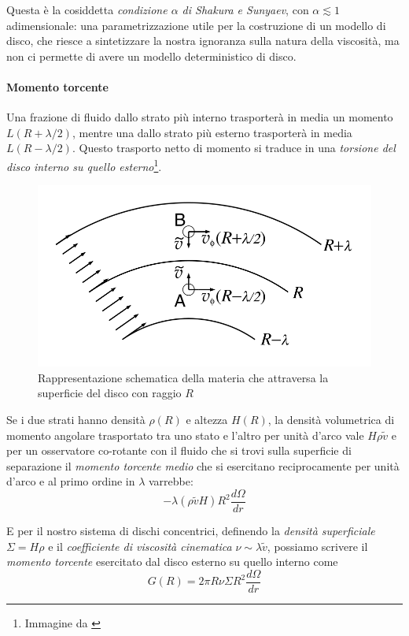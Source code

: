 \documentclass[a4paperbi]{article}
\begin{document}
	Questa è la cosiddetta \textit{condizione $\alpha$ di Shakura e Sunyaev}, con $\alpha\lesssim 1$ adimensionale: una parametrizzazione utile per la costruzione di un modello di disco, che riesce a sintetizzare la nostra ignoranza sulla natura della viscosità, ma non ci permette di avere un modello deterministico di disco.
	
	\paragraph{Momento torcente}	

	Una frazione di fluido dallo strato più interno trasporterà in media un momento $L(R+\lambda/2)$, mentre una dallo strato più esterno trasporterà in media $L(R-\lambda/2)$. Questo trasporto netto di momento si traduce in una \textit{torsione del disco interno su quello esterno}\footnote{Immagine da \cite{FrankKingRaineAccretionPower}}.
	
	\begin{figure}[H]
		\centering
		\includegraphics[width=0.6\linewidth]{TraspoMateria}
		\caption{Rappresentazione schematica della materia che attraversa la superficie del disco con raggio $R$}
		\label{fig:TraspoMateria}
	\end{figure}
		
	Se i due strati hanno densità $\rho(R)$ e altezza $H(R)$, la densità volumetrica di momento angolare trasportato tra uno stato e l'altro per unità d'arco vale $H\rho\tilde{v}$ e per un osservatore co-rotante con il fluido che si trovi sulla superficie di separazione il \textit{momento torcente medio} che si esercitano reciprocamente per unità d'arco e al primo ordine in $\lambda$ varrebbe:
	\begin{equation*}
		-\lambda(\rho\tilde{v} H) R^2\frac{d\Omega}{dr}
	\end{equation*}

	E per il nostro sistema di dischi concentrici, definendo la \textit{densità superficiale} $\Sigma=H\rho$ e il \textit{coefficiente di viscosità cinematica} $\nu\sim\lambda\tilde{v}$, possiamo scrivere il \textit{momento torcente} esercitato dal disco esterno su quello interno come
	\begin{equation}
		G(R)=2\pi R\nu\Sigma R^2\frac{d\Omega}{dr}
	\end{equation}
\end{document}

